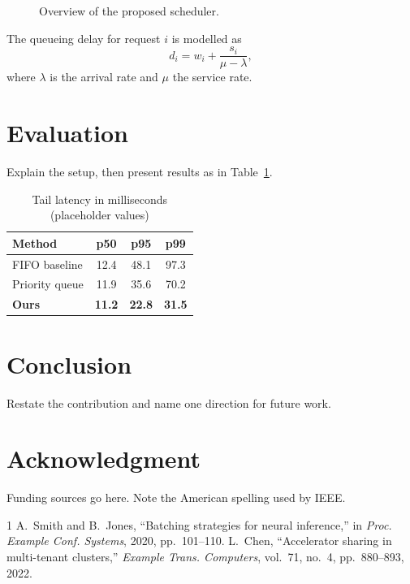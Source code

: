 \documentclass[conference]{IEEEtran}
\begin{document}
\begin{figure}[t]
  \centering
  \caption{Overview of the proposed scheduler.}
  \label{fig:arch}
\end{figure}

The queueing delay for request $i$ is modelled as
\begin{equation}
  d_i = w_i + \frac{s_i}{\mu - \lambda},
\end{equation}
where $\lambda$ is the arrival rate and $\mu$ the service rate.

\section{Evaluation}
Explain the setup, then present results as in Table~\ref{tab:results}.

\begin{table}[t]
  \centering
  \caption{Tail latency in milliseconds (placeholder values)}
  \label{tab:results}
  \begin{tabular}{lccc}
    \toprule
    Method & p50 & p95 & p99 \\
    \midrule
    FIFO baseline & 12.4 & 48.1 & 97.3 \\
    Priority queue & 11.9 & 35.6 & 70.2 \\
    \textbf{Ours} & \textbf{11.2} & \textbf{22.8} & \textbf{31.5} \\
    \bottomrule
  \end{tabular}
\end{table}

\section{Conclusion}
Restate the contribution and name one direction for future work.

\section*{Acknowledgment}
Funding sources go here. Note the American spelling used by IEEE.

\begin{thebibliography}{1}
 A.~Smith and B.~Jones, ``Batching strategies for neural inference,'' in \emph{Proc. Example Conf. Systems}, 2020, pp.~101--110.
 L.~Chen, ``Accelerator sharing in multi-tenant clusters,'' \emph{Example Trans. Computers}, vol.~71, no.~4, pp.~880--893, 2022.
\end{thebibliography}
\end{document}
